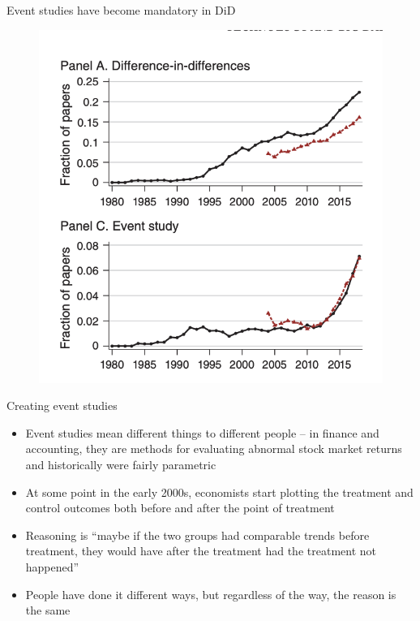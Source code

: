 \documentclass{beamer}
\begin{document}
\begin{frame}{Event studies have become mandatory in DiD}

	\begin{figure}
	\includegraphics[scale=0.5]{./lecture_includes/currie_eventstudy.png}
	\end{figure}

\end{frame}




\begin{frame}{Creating event studies}

\begin{itemize}

\item Event studies mean different things to different people -- in finance and accounting, they are methods for evaluating abnormal stock market returns and historically were fairly parametric
\item At some point in the early 2000s, economists start plotting the treatment and control outcomes both before and after the point of treatment
\item Reasoning is ``maybe if the two groups had comparable trends before treatment, they would have after the treatment had the treatment not happened''
\item People have done it different ways, but regardless of the way, the reason is the same

\end{itemize}

\end{frame}
\end{document}
